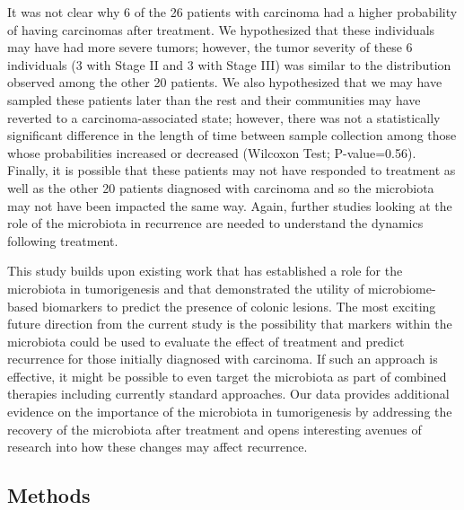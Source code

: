 \documentclass[12pt,]{article}
\begin{document}
It was not clear why 6 of the 26 patients with carcinoma had a higher
probability of having carcinomas after treatment. We hypothesized that
these individuals may have had more severe tumors; however, the tumor
severity of these 6 individuals (3 with Stage II and 3 with Stage III)
was similar to the distribution observed among the other 20 patients. We
also hypothesized that we may have sampled these patients later than the
rest and their communities may have reverted to a carcinoma-associated
state; however, there was not a statistically significant difference in
the length of time between sample collection among those whose
probabilities increased or decreased (Wilcoxon Test; P-value=0.56).
Finally, it is possible that these patients may not have responded to
treatment as well as the other 20 patients diagnosed with carcinoma and
so the microbiota may not have been impacted the same way. Again,
further studies looking at the role of the microbiota in recurrence are
needed to understand the dynamics following treatment.

This study builds upon existing work that has established a role for the
microbiota in tumorigenesis and that demonstrated the utility of
microbiome-based biomarkers to predict the presence of colonic lesions.
The most exciting future direction from the current study is the
possibility that markers within the microbiota could be used to evaluate
the effect of treatment and predict recurrence for those initially
diagnosed with carcinoma. If such an approach is effective, it might be
possible to even target the microbiota as part of combined therapies
including currently standard approaches. Our data provides additional
evidence on the importance of the microbiota in tumorigenesis by
addressing the recovery of the microbiota after treatment and opens
interesting avenues of research into how these changes may affect
recurrence.

\newpage

\subsection{Methods}\label{methods}
\end{document}
